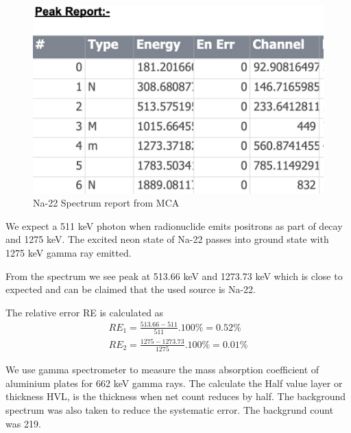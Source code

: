 \documentclass[a4paper, amsfonts, amssymb, amsmath, reprint, showkeys, nofootinbib, twoside]{revtex4-1}
\begin{document}
\begin{figure}[H]
	\centering
	\includegraphics[width=\columnwidth]{ca}
	\caption{Na-22 Spectrum report from MCA}
\end{figure}

We expect a 511 keV photon when radionuclide emits positrons as part of decay and 1275 keV. The excited neon state of Na-22 passes into ground state with 1275 keV gamma ray emitted. 

From the spectrum we see peak at 513.66 keV and 1273.73 keV which is close to expected and can be claimed that the used source is Na-22.

The relative error RE is calculated as 
\begin{align}
	RE_1=\frac{513.66-511}{511}.100\%=0.52\%\\
	RE_2=\frac{1275-1273.73}{1275}.100\%=0.01\%
\end{align}


We use gamma spectrometer to measure the mass absorption coefficient of aluminium plates for 662 keV gamma rays. The calculate the Half value layer or thickness HVL, is the thickness when net count reduces by half. The background spectrum was also taken to reduce the systematic error. The backgrund count was 219.
\end{document}
